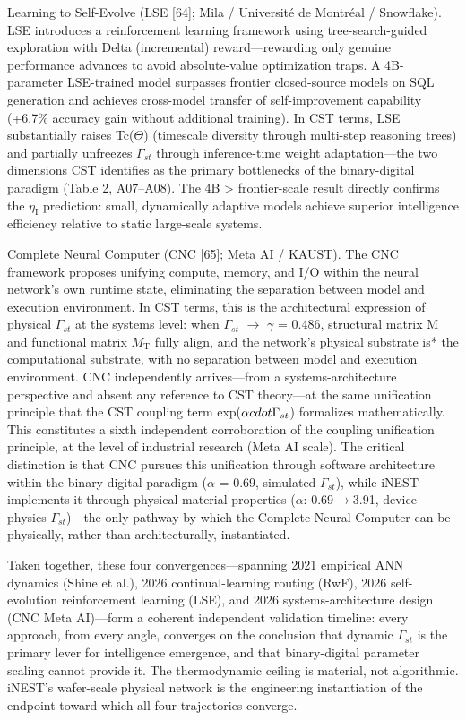 \documentclass[a4paper,12pt]{article}
\begin{document}
Learning to Self-Evolve (LSE [64]; Mila / Universit\'{e} de Montr\'{e}al / Snowflake). LSE introduces a reinforcement learning framework using tree-search-guided exploration with Delta (incremental) reward---rewarding only genuine performance advances to avoid absolute-value optimization traps. A 4B-parameter LSE-trained model surpasses frontier closed-source models on SQL generation and achieves cross-model transfer of self-improvement capability (+6.7\% accuracy gain without additional training). In CST terms, LSE substantially raises Tc($\Theta$) (timescale diversity through multi-step reasoning trees) and partially unfreezes $\Gamma_{st}$ through inference-time weight adaptation---the two dimensions CST identifies as the primary bottlenecks of the binary-digital paradigm (Table 2, A07--A08). The 4B > frontier-scale result directly confirms the $\eta_{\text{I}}$ prediction: small, dynamically adaptive models achieve superior intelligence efficiency relative to static large-scale systems.


Complete Neural Computer (CNC [65]; Meta AI / KAUST). The CNC framework proposes unifying compute, memory, and I/O within the neural network's own runtime state, eliminating the separation between model and execution environment. In CST terms, this is the architectural expression of physical $\Gamma_{st}$ at the systems level: when $\Gamma_{st}$ $\rightarrow$ $\gamma$ = 0.486, structural matrix M_{} and functional matrix $M_{\text{T}}$ fully align, and the network's physical substrate is* the computational substrate, with no separation between model and execution environment. CNC independently arrives---from a systems-architecture perspective and absent any reference to CST theory---at the same unification principle that the CST coupling term exp($\alpha \\cdot \Gamma_{st}$) formalizes mathematically. This constitutes a sixth independent corroboration of the coupling unification principle, at the level of industrial research (Meta AI scale). The critical distinction is that CNC pursues this unification through software architecture within the binary-digital paradigm ($\alpha$ = 0.69, simulated $\Gamma_{st}$), while iNEST implements it through physical material properties ($\alpha$: 0.69$\rightarrow$3.91, device-physics $\Gamma_{st}$)---the only pathway by which the Complete Neural Computer can be physically, rather than architecturally, instantiated.


Taken together, these four convergences---spanning 2021 empirical ANN dynamics (Shine et al.), 2026 continual-learning routing (RwF), 2026 self-evolution reinforcement learning (LSE), and 2026 systems-architecture design (CNC Meta AI)---form a coherent independent validation timeline: every approach, from every angle, converges on the conclusion that dynamic $\Gamma_{st}$ is the primary lever for intelligence emergence, and that binary-digital parameter scaling cannot provide it. The thermodynamic ceiling is material, not algorithmic. iNEST's wafer-scale physical network is the engineering instantiation of the endpoint toward which all four trajectories converge.
\end{document}
